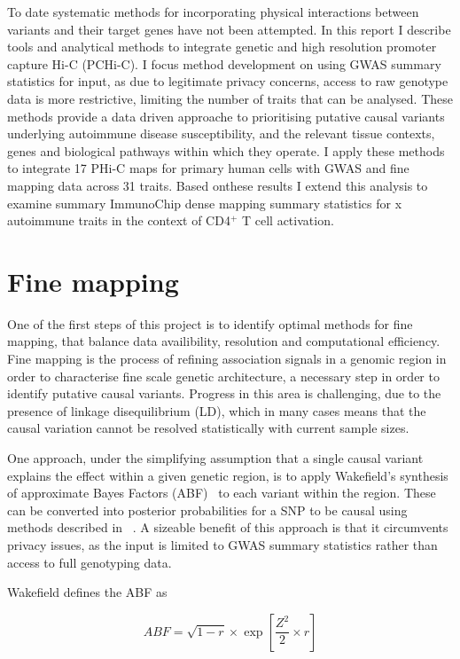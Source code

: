 \documentclass[a4paper,11pt]{report}
\begin{document}
To date systematic methods for incorporating physical interactions between variants and their target genes have not been attempted. In this report I describe tools and analytical methods to integrate genetic and high resolution promoter capture Hi-C (PCHi-C). I focus method development on using GWAS summary statistics for input, as due to legitimate privacy concerns, access to raw genotype data is more restrictive, limiting the number of traits that can be analysed. These methods provide a data driven approache to prioritising putative causal variants underlying autoimmune disease susceptibility, and the relevant tissue contexts, genes and biological pathways within which they operate. I apply these methods to integrate 17 PHi-C maps for primary human cells with GWAS and fine mapping data across 31 traits. Based onthese results I extend this analysis to examine summary ImmunoChip dense mapping summary statistics for x autoimmune traits in the context of CD4${^+}$ T cell activation.

\section{Fine mapping}
One of the first steps of this project is to identify optimal methods for fine mapping, that balance data availibility, resolution and computational efficiency. Fine mapping is the process of refining association signals in a genomic region in order to characterise fine scale genetic architecture, a necessary step in order to identify putative causal variants. Progress in this area is challenging, due to the presence of linkage disequilibrium (LD), which in many cases means that the causal variation cannot be resolved statistically with current sample sizes. 

 One approach, under the simplifying assumption that a single causal variant explains the effect within a given genetic region, is to apply Wakefield's synthesis of approximate Bayes Factors (ABF)~\citep{Wakefield2009} to each variant within the region. These can be converted into posterior probabilities for a SNP to be causal using methods described in ~\citet{The_Wellcome_Trust_Case_Control_Consortium2012-ad}. A sizeable benefit of this approach is that it circumvents privacy issues, as the input is limited to GWAS summary statistics rather than access to full genotyping data.

Wakefield defines the ABF as

\begin{equation}
	ABF =  \sqrt{1 - r} \times \exp{\left[\frac{Z^{2}}{2} \times r\right]}
\end{equation}
\end{document}
